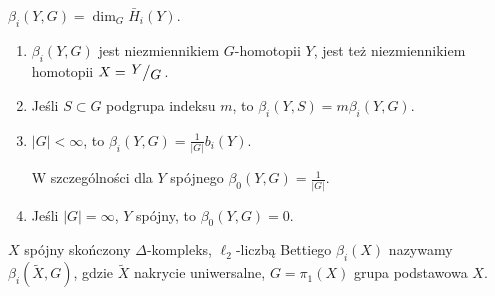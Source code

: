 \begin{definicja}
	$\beta_i(Y, G) = \dim_G \bar{H}_i(Y)$.
\end{definicja}

\begin{stwierdzenie}
	\begin{enumerate}
		\item $\beta_i(Y, G)$ jest niezmiennikiem $G$-homotopii $Y$,
		jest też niezmiennikiem homotopii $X = \bigslant Y G$.
		
		\item Jeśli $S \subset G$ podgrupa indeksu $m$,
		to $\beta_i(Y, S) = m \beta_i(Y, G)$.
		
		\item $|G| < \infty$, to $\beta_i(Y, G) 
		= \frac 1 {|G|} b_i(Y)$.
		
		W szczególności dla $Y$ spójnego $\beta_0(Y, G)
		= \frac{1}{|G|}$.
		
		\item Jeśli $|G| = \infty$, $Y$ spójny, to $\beta_0(Y, G) = 0$.
	\end{enumerate}
\end{stwierdzenie}

\begin{definicja}
	$X$ spójny skończony $\Delta$-kompleks,
	$\ell_2$-liczbą Bettiego $\beta_i(X)$ nazywamy
	$\beta_i(\tilde{X}, G)$, gdzie
	$\tilde{X}$ nakrycie uniwersalne,
	$G = \pi_1(X)$ grupa podstawowa $X$.
\end{definicja}








